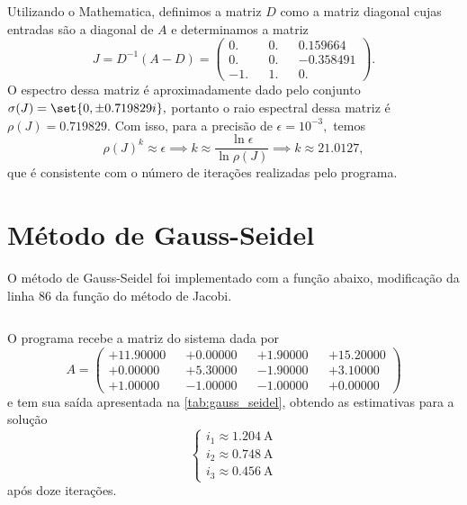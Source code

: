 \documentclass[portuguese,minted]{artigo}
\begin{document}
Utilizando o Mathematica, definimos a matriz \(D\) como a matriz diagonal cujas entradas são a diagonal de \(A\) e determinamos a matriz
\begin{equation*}
    J = D^{-1} (A - D) = 
    \begin{pmatrix}
        0. &&  0. && 0.159664\\
        0. &&  0. && -0.358491\\
        -1.&& 1. && 0.
    \end{pmatrix}.
\end{equation*}
O espectro dessa matriz é aproximadamente dado pelo conjunto \(\sigma(J) = \set{0, \pm 0.719829i},\) portanto o raio espectral dessa matriz é \(\rho(J) = 0.719829.\) Com isso, para a precisão de \(\epsilon = 10^{-3},\) temos
\begin{equation*}
    \rho(J)^k \approx \epsilon \implies k \approx \frac{\ln \epsilon}{\ln \rho(J)} \implies k \approx 21.0127,
\end{equation*}
que é consistente com o número de iterações realizadas pelo programa.

\section{Método de Gauss-Seidel}
O método de Gauss-Seidel foi implementado com a função abaixo, modificação da linha 86 da função do método de Jacobi.
\inputminted[firstline=109,lastline=152]{c}{src/main.c}

O programa recebe a matriz do sistema dada por
\begin{equation*}
    A = \begin{pmatrix}
        +11.90000&&+0.00000&&+1.90000&&+15.20000\\
        +0.00000&&+5.30000&&-1.90000&&+3.10000\\
        +1.00000&&-1.00000&&-1.00000&&+0.00000
    \end{pmatrix}
\end{equation*}
e tem sua saída apresentada na \cref{tab:gauss_seidel}, obtendo as estimativas para a solução
\begin{equation*}
    \begin{cases}
        i_1 \approx \SI{1.204}{\ampere}\\
        i_2 \approx \SI{0.748}{\ampere}\\
        i_3 \approx \SI{0.456}{\ampere}
    \end{cases}
\end{equation*}
após doze iterações.
\end{document}
